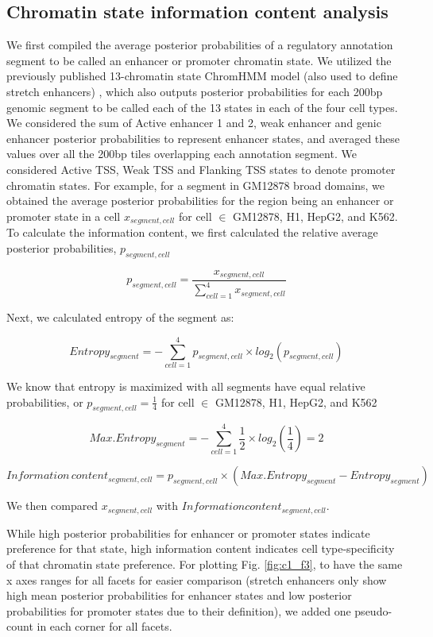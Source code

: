 \subsection{Chromatin state information content analysis}
We first compiled the average posterior probabilities of a regulatory annotation segment to be called an enhancer or promoter chromatin state. We utilized the previously published 13-chromatin state ChromHMM model (also used to define stretch enhancers) \cite{varshneyGeneticRegulatorySignatures2017}, which also outputs posterior probabilities for each 200bp genomic segment to be called each of the 13 states in each of the four cell types. We considered the sum of Active enhancer 1 and 2, weak enhancer and genic enhancer posterior probabilities to represent enhancer states, and averaged these values over all the 200bp tiles overlapping each annotation segment. We considered Active TSS, Weak TSS and Flanking TSS states to denote promoter chromatin states. For example, for a segment in GM12878 broad domains, we obtained the average posterior probabilities for the region being an enhancer or promoter state in a cell \(x_{segment, cell}\) for cell \( \in \) {GM12878, H1, HepG2, and K562}. To calculate the information content, we first calculated the relative average posterior probabilities, \(p_{segment, cell}\)

\[ p_{segment, cell} = \frac{x_{segment, cell}} { \sum_{cell=1}^{4}x_{segment, cell}} \]

Next, we calculated entropy of the segment as:

\[ Entropy_{segment}= -\sum_{cell=1}^{4}p_{segment, cell} \times log_2(p_{segment, cell}) \]

We know that entropy is maximized with all segments have equal relative probabilities, or \( p_{segment, cell} = \frac{1}{4} \) for cell \( \in \) {GM12878, H1, HepG2, and K562}

\[ Max. Entropy_{segment} = -\sum_{cell=1}^{4}\frac{1}{2} \times log_2(\frac{1}{4}) = 2 \]

\[ Information\, content_{segment,cell} = p_{segment, cell} \times (Max. Entropy_{segment} - Entropy_{segment}) \]

We then compared \(x_{segment, cell}\) with \(Information content_{segment, cell}\).

While high posterior probabilities for enhancer or promoter states indicate preference for that state, high information content indicates cell type-specificity of that chromatin state preference. For plotting Fig. \ref{fig:c1_f3}, to have the same x axes ranges for all facets for easier comparison (stretch enhancers only show high mean posterior probabilities for enhancer states and low posterior probabilities for promoter states due to their definition), we added one pseudo-count in each corner for all facets.

